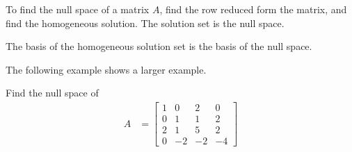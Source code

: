 \begin{Boxed*}
To find the null space of a matrix $A$, find the row reduced form the matrix, and find the homogeneous solution.  The solution set is the null space.

\medskip

\noindent{}The basis of the homogeneous solution set is the basis of the null space.
\end{Boxed*}


The following example shows a larger example.

\begin{example} \label{ex:nullity2}
Find the null space of
%
\begin{align*}
A & = \begin{bmatrix}
1 & 0 & 2 & 0 \\
0 & 1 & 1 & 2 \\
2 & 1 & 5 & 2 \\
0 & -2 & -2 & -4
\end{bmatrix}
\end{align*}

\solution


\end{example}
